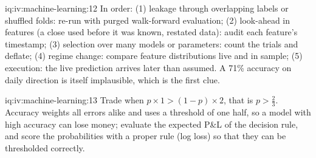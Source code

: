 \begin{solution}{iq:iv:machine-learning:12}
In order: (1) leakage through overlapping labels or shuffled folds: re-run with purged walk-forward evaluation; (2) look-ahead in
features (a close used before it was known, restated data): audit each feature's timestamp; (3) selection over many models or
parameters: count the trials and deflate; (4) regime change: compare feature distributions live and in sample; (5) execution:
the live prediction arrives later than assumed. A 71\% accuracy on daily direction is itself implausible, which is the first
clue.
\end{solution}

\begin{solution}{iq:iv:machine-learning:13}
Trade when $p \times 1 > (1 - p) \times 2$, that is $p > \tfrac23$. Accuracy weights all errors alike and uses a threshold of one
half, so a model with high accuracy can lose money; evaluate the expected P\&L of the decision rule, and score the probabilities
with a proper rule (log loss) so that they can be thresholded correctly.
\end{solution}
